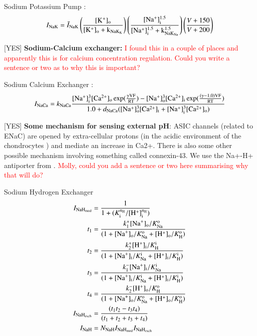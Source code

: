 Sodium Potassium Pump \citep[Table 12, pp. 77]{Nygrenetal1998}:
\begin{equation}
  I_{\rm NaK} =
  \bar{I}_{\rm NaK} \left( \frac{[\rm K^{+}]_{\rm o}}{[\rm K^{+}]_{\rm o} +
    k_{\rm NaK_{K}}} \right) \left(\frac{[\rm Na^{+}]^{1.5}_{\rm i}}{[\rm
    Na^{+}]^{1.5}_{\rm i} + k^{1.5}_{\rm NaK_{Na}}}\right) \left( \frac{V + 150}{V +
    200} \right)
\end{equation}

[YES] {\bf Sodium-Calcium exchanger:} \textcolor{red}{I found this in
  a couple of places and apparently this is for calcium concentration
  regulation. Could you write a sentence or two as to why this is
  important?}

Sodium Calcium Exchanger \citep[Table 13, pp. 77]{Nygrenetal1998}:
\begin{equation}
  I_{\rm NaCa} = k_{\rm NaCa} \frac{[\rm Na^{+}]^{3}_{i}[\rm
    Ca^{2+}]_{o} \exp(\frac{\gamma V F}{R T}) - [\rm
    Na^{+}]^{3}_{o}[\rm Ca^{2+}]_{i} \exp(\frac{(\gamma - 1.0) V F}{R
      T})} {1.0 + d_{\rm NaCa}([\rm Na^{+}]^{3}_{o}[\rm Ca^{2+}]_{i} +
    [\rm Na^{+}]^{3}_{i}[\rm Ca^{2+}]_{o})}
\end{equation}

[YES] {\bf Some mechanism for sensing external pH}: ASIC channels
(related to ENaC) are opened by extra-cellular protons (in the acidic
environment of the chondrocytes ) and mediate an increase in
Ca2+. There is also some other possible mechanism involving something
called connexin-43. We use the Na+-H+ antiporter from
\citet{Halletal1996,Wilkinsetal2000}. \textcolor{red}{Molly, could you
  add a sentence or two here summarising why that will do?}

Sodium Hydrogen Exchanger \citep[Eq. 2, pp. 2675]{Chaetal2009}
\begin{equation}
  \begin{split}
    I_{{\rm NaH}_{\rm mod}} & = \frac{1}{1 + (K_{\rm i}^{n_{\rm
          H}}/[{\rm H}^{+}]_{\rm i}^{n_{\rm H}})}\\
    t_{1} & = \frac{k_{1}^{+} [{\rm Na}^{+}]_{\rm o}/K_{\rm Na}^{\rm
        o}} {(1 + [{\rm Na}^{+}]_{\rm o}/K_{\rm Na}^{\rm o} + [{\rm
        H}^{+}]_{\rm o} /K_{\rm H}^{\rm o})}\\
    t_{2} & = \frac{k_{2}^{+} [{\rm H}^{+}]_{\rm i}/K_{\rm H}^{\rm i}}
    {(1 + [{\rm Na}^{+}]_{\rm i}/K_{\rm Na}^{\rm i} + [{\rm
        H}^{+}]_{\rm i}/K_{\rm H}^{\rm i})}\\
    t_{3} & = \frac{k_{1}^{-} [{\rm Na}^{+}]_{\rm i}/K_{\rm Na}^{\rm
        i}} {(1 + [{\rm Na}^{+}]_{\rm i}/K_{\rm Na}^{\rm i} + [{\rm
        H}^{+}]_{\rm i} /K_{\rm H}^{\rm i})}\\
    t_{4} & = \frac{k_{2}^{-} [{\rm H}^{+}]_{\rm o}/K_{\rm H}^{\rm
        o}} {(1 + [{\rm Na}^{+}]_{\rm o}/K_{\rm Na}^{\rm o} + [{\rm
        H}^{+}]_{\rm o} /K_{\rm H}^{\rm o})}\\
    I_{{\rm NaH}_{\rm exch}} & = \frac{(t_1 t_2 - t_3 t_4)}
    {(t_1 + t_2 + t_3 + t_4)}\\
    I_{\rm NaH} & = N_{\rm NaH} I_{\rm NaH_{\rm mod}}
    I_{\rm NaH_{\rm exch}}
  \end{split}
\end{equation}

